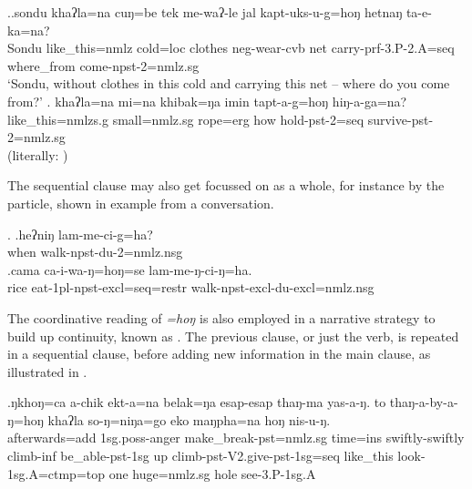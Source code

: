 \ex.\ag.\label{ex_sondu}sondu  khaʔla=na      cuŋ=be  tek   me-waʔ-le  jal kapt-uks-u-g=hoŋ hetnaŋ    ta-e-ka=na?\\
		Sondu like\_this={\sc nmlz} cold={\sc loc} clothes {\sc neg}-wear-{\sc cvb} net carry{\sc -prf-3.P-2.A=seq}  where\_from come{\sc -npst-2=nmlz.sg}\\
		‘Sondu, without clothes in this cold and carrying this net – where do you come from?’ 	
\bg. khaʔla=na          mi=na  khibak=ŋa   imin tapt-a-g=hoŋ          hiŋ-a-ga=na?\\
like\_this{\sc =nmlzs.g} small{\sc =nmlz.sg} rope{\sc =erg} how hold{\sc -pst-2=seq} survive{\sc -pst-2=nmlz.sg} \\
 (literally: ) 

		
The sequential clause may also get focussed on as a whole, for instance by the  particle, shown in example \Next from a conversation. 
		
		\ex. \ag.heʔniŋ lam-me-ci-g=ha?\\
		when walk{\sc -npst-du-2=nmlz.nsg}\\
		\bg.cama ca-i-wa-ŋ=hoŋ=se lam-me-ŋ-ci-ŋ=ha.\\
		rice eat{\sc -1pl-npst-excl=seq=restr} walk{\sc -npst-excl-du-excl=nmlz.nsg}\\

	
The coordinative reading of  \emph{=hoŋ} is also employed in a narrative strategy  to build up continuity, known as  \citep[39]{Ebert2003Equivalents}. The previous clause, or just the verb, is repeated in a sequential clause, before adding new information in the main clause, as illustrated in \Next.

\exg.ŋkhoŋ=ca  a-chik ekt-a=na belak=ŋa  esap-esap thaŋ-ma    yas-a-ŋ. to  thaŋ-a-by-a-ŋ=hoŋ khaʔla   so-ŋ=niŋa=go eko maŋpha=na hoŋ nis-u-ŋ.\\
afterwards{\sc =add} {\sc 1sg.poss-}anger make\_break{\sc -pst=nmlz.sg} time{\sc =ins} swiftly-swiftly climb{\sc -inf} be\_able{\sc -pst-1sg} up climb{\sc -pst-V2.give-pst-1sg=seq} like\_this look{\sc [pst]-1sg.A=ctmp=top} one huge{\sc =nmlz.sg} hole see{\sc [pst]-3.P-1sg.A}\\
 

